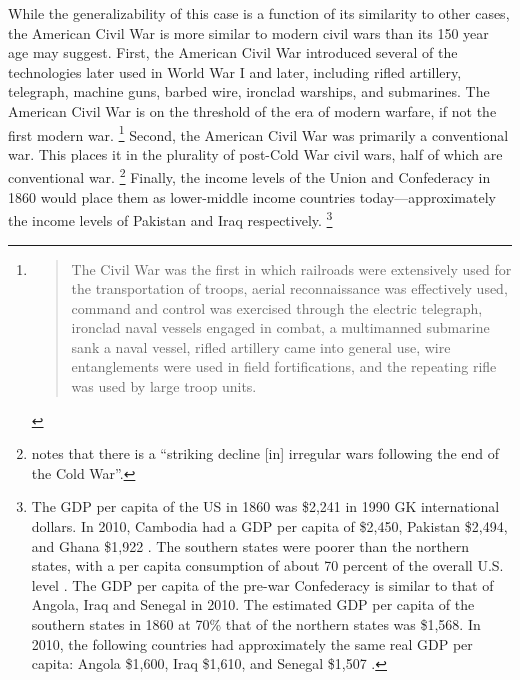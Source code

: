 While the generalizability of this case is a function of its similarity to other cases, the American Civil War is more similar to modern civil wars than its 150 year age may suggest.
First, the American Civil War introduced several of the technologies later used in World War I and later, including rifled artillery, telegraph, machine guns, barbed wire, ironclad warships, and submarines.
The American Civil War is on the threshold of the era of modern warfare, if not the first modern war\parencites[89][]{Fuller1956a}[760]{Weiss1966}.%
\footnote{
  \begin{quotation}
    The Civil War was the first in which railroads were extensively used for the transportation of troops, aerial reconnaissance was effectively used, command and control was exercised through the electric telegraph, ironclad naval vessels engaged in combat, a multimanned submarine sank a naval vessel, rifled artillery came into general use, wire entanglements were used in field fortifications, and the repeating rifle was used by large troop units. \parencite[760]{Weiss1966}
  \end{quotation}
}
Second, the American Civil War was primarily a conventional war.
This places it in the plurality of post-Cold War civil wars, half of which are conventional war\parencite[423]{kalyvas2010inter}.%
\footnote{
  \textcite{kalyvas2010inter} notes that there is a ``striking decline [in] irregular wars following the end of the Cold War''.
}
Finally, the income levels of the Union and Confederacy in 1860 would place them as lower-middle income countries today---approximately the income levels of Pakistan and Iraq respectively.%
\footnote{%
  The GDP per capita of the US in 1860 was \$2,241 in 1990 GK international dollars. %
  In 2010, Cambodia had a GDP per capita of \$2,450, Pakistan \$2,494, and Ghana \$1,922 \parencite{BoltZanden2013}. %
  The southern states were poorer than the northern states, with a per capita consumption of about 70 percent of the overall U.S. level \parencite[324]{GoldinLewis1975}.
  The GDP per capita of the pre-war Confederacy is similar to that of Angola, Iraq and Senegal in 2010.%
  The estimated GDP per capita of the southern states in 1860 at 70\% that of the northern states was \$1,568. %
  In 2010, the following countries had approximately the same real GDP per capita: Angola \$1,600, Iraq \$1,610, and Senegal \$1,507 \parencite{BoltZanden2013}. %
}

